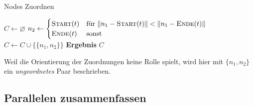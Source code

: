 \documentclass[../main/thesis.tex]{subfiles}
\begin{document}
\begin{algorithmhere}{Nodes Zuordnen}
\label{alg:Zuordnen}
\begin{algorithmic}
	\State $C \gets \varnothing$
				\State $n_2 \gets \begin{cases}\textproc{Start}(t) & \text{für } \abs n_1 - \textproc{Start}(t)\abs < \abs n_1 - \textproc{Ende}(t)\abs\\\textproc{Ende}(t) & \text{sonst}\end{cases}$
				\State $C \gets C \cup \{\{n_1, n_2\}\}$
			\EndFor
		\EndFor
	\EndFor
	\State \textbf{Ergebnis} $C$
\EndFunction
\end{algorithmic}
\end{algorithmhere}


Weil die Orientierung der Zuordnungen keine Rolle spielt, wird hier mit $\{n_1, n_2\}$ ein \emph{ungeordnetes} Paar beschrieben.


\subsection{Parallelen zusammenfassen}
\label{ch:generalisation-algorithm}

%
\end{document}
